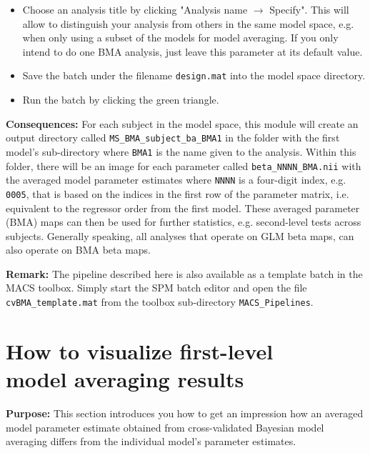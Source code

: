 \documentclass[a4paper,12pt]{article}
\newcommand{\ra}{$\rightarrow$ }
\begin{document}
\begin{itemize}
\pagebreak
\item
Choose an analysis title by clicking "Analysis name \ra Specify". This will allow to distinguish your analysis from others in the same model space, e.g. when only using a subset of the models for model averaging. If you only intend to do one BMA analysis, just leave this parameter at its default value.

\item
Save the batch under the filename \texttt{design.mat} into the model space directory.

\item
Run the batch by clicking the green triangle.
	
\end{itemize}

\textbf{Consequences:} For each subject in the model space, this module will create an output directory called \texttt{MS\_BMA\_subject\_ba\_BMA1} in the folder with the first model's sub-directory where \texttt{BMA1} is the name given to the analysis. Within this folder, there will be an image for each parameter called \texttt{beta\_NNNN\_BMA.nii} with the averaged model parameter estimates where \texttt{NNNN} is a four-digit index, e.g. \texttt{0005}, that is based on the indices in the first row of the parameter matrix, i.e. equivalent to the regressor order from the first model. These averaged parameter (BMA) maps can then be used for further statistics, e.g. second-level tests across subjects. Generally speaking, all analyses that operate on GLM beta maps, can also operate on BMA beta maps.

\textbf{Remark:} The pipeline described here is also available as a template batch in the MACS toolbox. Simply start the SPM batch editor and open the file \texttt{cvBMA\_template.mat} from the toolbox sub-directory \texttt{MACS\_Pipelines}.



\pagebreak
\section[How to visualize first-level model averaging results]{How to visualize first-level \\ model averaging results} \label{sec:cvBMA-vis}

\textbf{Purpose:} This section introduces you how to get an impression how an averaged model parameter estimate obtained from cross-validated Bayesian model averaging differs from the individual model's parameter estimates.
\end{document}
